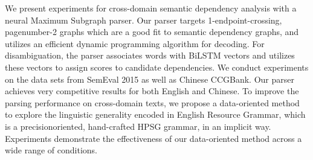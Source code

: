 We present experiments for cross-domain semantic dependency analysis with a neural Maximum Subgraph parser. Our parser targets 1-endpoint-crossing, pagenumber-2 graphs which are a good fit to semantic dependency graphs, and utilizes an efficient dynamic programming algorithm for decoding. For disambiguation, the parser associates words with BiLSTM vectors and utilizes these vectors to assign scores to candidate dependencies. We conduct experiments on the data sets from SemEval 2015 as well as Chinese CCGBank. Our parser achieves very competitive results for both English and Chinese. To improve the parsing performance on cross-domain texts, we propose a data-oriented method to explore the linguistic generality encoded in English Resource Grammar, which is a precisionoriented, hand-crafted HPSG grammar, in an implicit way. Experiments demonstrate the effectiveness of our data-oriented method across a wide range of conditions.
